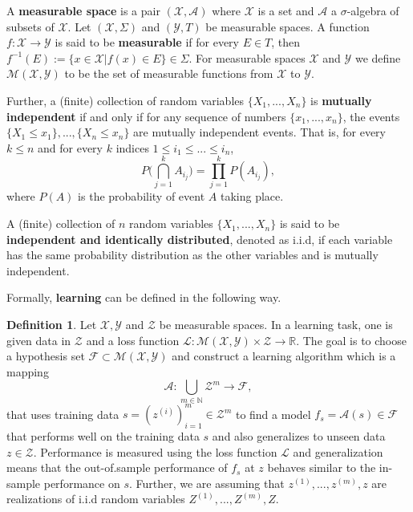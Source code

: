 \documentclass[11pt]{article}
\theoremstyle{definition}
\newtheorem{defn}{Definition}
\begin{document}
A \textbf{measurable space} is a pair $(\mathcal{X}, \mathcal{A})$ where $\mathcal{X}$ is a set and $\mathcal{A}$ a $\sigma$-algebra of subsets of $\mathcal{X}$. Let $(\mathcal{X}, \Sigma)$ and $(\mathcal{Y}, T)$ be measurable spaces. A function $f: \mathcal{X} \rightarrow \mathcal{Y}$ is said to be \textbf{measurable} if for every $E \in T$, then $f^{-1}(E) := \{x \in \mathcal{X} | f(x) \in E\} \in \Sigma$. For measurable spaces $\mathcal{X}$ and $\mathcal{Y}$ we define $\mathcal{M}(\mathcal{X}, \mathcal{Y})$ to be the set of measurable functions from $\mathcal{X}$ to $\mathcal{Y}$.

Further, a (finite) collection of random variables $\{X_1, ..., X_n\}$ is \textbf{mutually independent} if and only if for any sequence of numbers $\{x_1, ..., x_n\}$, the events $\{X_1 \leq x_1\}, ..., \{X_n \leq x_n\}$ are mutually independent events. That is, for every $k \leq n$ and for every $k$ indices $1 \leq i_1 \leq ... \leq i_n$,
\begin{equation*}
    P\Big( \bigcap_{j=1}^k A_{i_j} \Big) = \prod_{j=1}^k P(A_{i_j}),
\end{equation*}
where $P(A)$ is the probability of event $A$ taking place.

A (finite) collection of $n$ random variables $\{X_1, ..., X_n\}$ is said to be \textbf{independent and identically distributed}, denoted as i.i.d, if each variable has the same probability distribution as the other variables and is mutually independent.

Formally, \textbf{learning} can be defined in the following way.

\begin{defn}
Let $\mathcal{X}, \mathcal{Y}$ and $\mathcal{Z}$ be measurable spaces. In a learning task, one is given data in $\mathcal{Z}$ and a loss function $\mathcal{L}: \mathcal{M}(\mathcal{X}, \mathcal{Y}) \times \mathcal{Z} \rightarrow \mathbb{R}$. The goal is to choose a hypothesis set $\mathcal{F} \subset \mathcal{M}(\mathcal{X}, \mathcal{Y})$ and construct a learning algorithm which is a mapping
\begin{equation*}
    \mathcal{A}: \bigcup_{m \in \mathbb{N}} \mathcal{Z}^m \rightarrow \mathcal{F},
\end{equation*}
that uses training data $s = (z^{(i)})_{i=1}^m \in \mathcal{Z}^m$ to find a model $f_s = \mathcal{A}(s) \in \mathcal{F}$ that performs well on the training data $s$ and also generalizes to unseen data $z \in \mathcal{Z}$. Performance is measured using the loss function $\mathcal{L}$ and generalization means that the out-of.sample performance of $f_s$ at $z$ behaves similar to the in-sample performance on $s$. Further, we are assuming that $z^{(1)}, ...,  z^{(m)}, z$ are realizations of i.i.d random variables $Z^{(1)}, ..., Z^{(m)}, Z$.
\end{defn}
\end{document}
